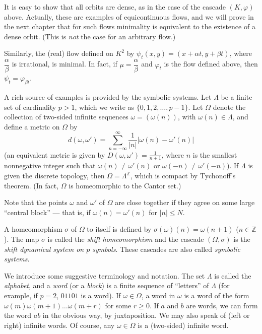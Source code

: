 It is easy to show that all orbits are dense, as in the case of the cascade $(K, \varphi)$ above. Actually, these are examples of equicontinuous flows, and we will prove in the next chapter that for such flows minimality is equivalent to the existence of a dense orbit. (This is \emph{not} the case for an arbitrary flow.)


Similarly, the (real) flow defined on $K^2$ by $\psi_t(x,y) = (x + \alpha t, y + \beta t)$, where $\dfrac{\alpha}{\beta}$ is irrational, is minimal. In fact, if $\mu = \dfrac{\alpha}{\beta}$ and $\varphi_t$ is the flow defined above, then $\psi_t = \varphi_{\beta t}$.

A rich source of examples is provided by the symbolic systems. Let $\Lambda$ be a finite set of cardinality $p > 1$, which we write as $\{0,1,2,\ldots,p-1\}$. Let $\Omega$ denote the collection of two-sided infinite sequences $\omega = (\omega(n))$, with $\omega(n) \in \Lambda$, and define a metric on $\Omega$ by
\[
    d(\omega, \omega') = \sum_{n=-\infty}^{\infty} \frac{1}{|n|} |\omega(n) - \omega'(n)|
\]
(an equivalent metric is given by $D(\omega, \omega') = \frac{1}{n+1}$, where $n$ is the smallest nonnegative integer such that $\omega(n) \neq \omega'(n)$ or $\omega(-n) \neq \omega'(-n)$). If $\Lambda$ is given the discrete topology, then $\Omega = \Lambda^{\mathbb{Z}}$, which is compact by Tychonoff’s theorem. (In fact, $\Omega$ is homeomorphic to the Cantor set.)

Note that the points $\omega$ and $\omega'$ of $\Omega$ are close together if they agree on some large “central block” — that is, if $\omega(n) = \omega'(n)$ for $|n| \le N$.


A homeomorphism $\sigma$ of $\Omega$ to itself is defined by $\sigma(\omega)(n) = \omega(n+1)$ ($n \in \mathbb{Z}$). The map $\sigma$ is called the \textit{shift homeomorphism} and the cascade $(\Omega, \sigma)$ is the \textit{shift dynamical system on $p$ symbols}. These cascades are also called \textit{symbolic systems}.

We introduce some suggestive terminology and notation. The set $\Lambda$ is called the \textit{alphabet}, and a \textit{word} (or a \textit{block}) is a finite sequence of “letters” of $\Lambda$ (for example, if $p = 2$, $01101$ is a word). If $\omega \in \Omega$, a word in $\omega$ is a word of the form $\omega(m)\omega(m+1)\ldots\omega(m+r)$ for some $r \ge 0$. If $a$ and $b$ are words, we can form the word $ab$ in the obvious way, by juxtaposition. We may also speak of (left or right) infinite words. Of course, any $\omega \in \Omega$ is a (two-sided) infinite word.

